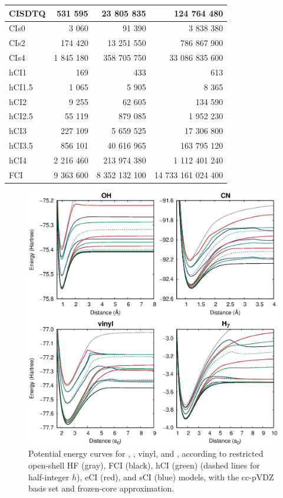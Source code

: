 \documentclass[aip,jcp,preprint,noshowkeys,superscriptaddress]{revtex4-1}
\begin{document}
\begin{table}[ht!]
\begin{ruledtabular}
\begin{tabular}{lrrr}
CISDTQ &    531 595 &    23 805 835 &        124 764 480 \\
\hline
CIs0   &      3 060 &        91 390 &          3 838 380 \\
CIs2   &    174 420 &    13 251 550 &        786 867 900 \\
CIs4   &  1 845 180 &   358 705 750 &     33 086 835 600 \\
\hline
hCI1   &        169 &           433 &                613 \\
hCI1.5 &      1 065 &         5 905 &              8 365 \\
hCI2   &      9 255 &        62 605 &            134 590 \\
hCI2.5 &     55 119 &       879 085 &          1 952 230 \\
hCI3   &    227 109 &     5 659 525 &         17 306 800 \\
hCI3.5 &    856 101 &    40 616 965 &        163 795 120 \\
hCI4   &  2 216 460 &   213 974 380 &      1 112 401 240 \\
\hline
FCI    &  9 363 600 & 8 352 132 100 & 14 733 161 024 400 \\
\end{tabular}
\end{ruledtabular}
\end{table}

\clearpage

\begin{figure}%
\includegraphics[width=1.0\linewidth]{plot_pes}
\caption{
Potential energy curves for , , vinyl, and ,
according to restricted open-shell HF (gray), FCI (black), hCI (green) (dashed lines for half-integer $h$), eCI (red), and sCI (blue) models, with the cc-pVDZ basis set and frozen-core approximation.}
\label{fig:plot_pes}
\end{figure}
\end{document}

